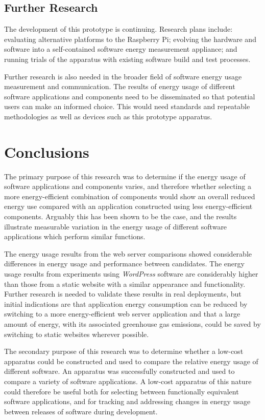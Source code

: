 \subsection{Further Research}

The development of this prototype is continuing. Research plans include: evaluating alternative platforms to the Raspberry Pi; evolving the hardware and software into a self-contained software energy measurement appliance; and running trials of the apparatus with existing software build and test processes.

Further research is also needed in the broader field of software energy usage measurement and communication. The results of energy usage of different software applications and components need to be disseminated so that potential users can make an informed choice. This would need standards and repeatable methodologies as well as devices such as this prototype apparatus.

\section{Conclusions}
\label{Conclusions}

The primary purpose of this research was to determine if the energy usage of software applications and components varies, and therefore whether selecting a more energy-efficient combination of components would show an overall reduced energy use compared with an application constructed using less energy-efficient components. Arguably this has been shown to be the case, and the results illustrate measurable variation in the energy usage of different software applications which perform similar functions.

The energy usage results from the web server comparisons showed considerable differences in energy usage and performance between candidates. The energy usage results from experiments using \emph{WordPress} software are considerably higher than those from a static website with a similar appearance and functionality. Further research is needed to validate these results in real deployments, but initial indications are that application energy consumption can be reduced by switching to a more energy-efficient web server application and that a large amount of energy, with its associated greenhouse gas emissions, could be saved by switching to static websites wherever possible.

The secondary purpose of this research was to determine whether a low-cost apparatus could be constructed and used to compare the relative energy usage of different software. An apparatus was successfully constructed and used to compare a variety of software applications. A low-cost apparatus of this nature could therefore be useful both for selecting between functionally equivalent software applications, and for tracking and addressing changes in energy usage between releases of software during development.

